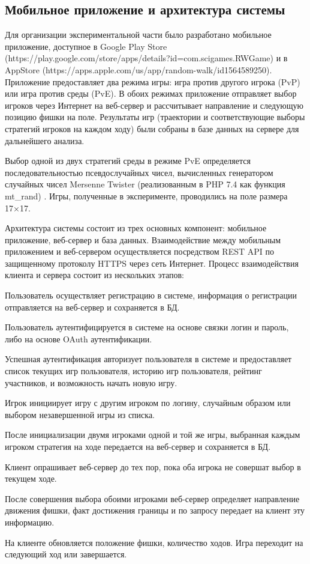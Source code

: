 \subsection{Мобильное приложение и архитектура системы}\label{subsec:ch1/sec2/sub2}

Для организации экспериментальной части было разработано мобильное приложение, 
доступное в Google Play Store (https://play.google.com/store/apps/details?id=com.scigames.RWGame) и 
в AppStore (https://apps.apple.com/us/app/random-walk/id1564589250). Приложение предоставляет два режима игры: 
игра против другого игрока (PvP) или игра против среды (PvE). В обоих режимах приложение отправляет выбор игроков 
через Интернет на веб-сервер и рассчитывает направление и следующую позицию фишки на поле. Результаты игр 
(траектории и соответствующие выборы стратегий игроков на каждом ходу) были собраны в базе данных на сервере для дальнейшего анализа.

Выбор одной из двух стратегий среды в режиме PvE определяется последовательностью псевдослучайных чисел, 
вычисленных генератором случайных чисел Mersenne Twister (реализованным в PHP 7.4 как функция mt_rand) \cite{}. 
Игры, полученные в эксперименте, проводились на  поле размера 17×17.

Архитектура системы состоит из трех основных компонент: мобильное приложение, веб-сервер и база данных.
Взаимодействие между мобильным приложением и веб-сервером осуществляется посредством REST API по защищенному протоколу HTTPS
через сеть Интернет. Процесс взаимодействия клиента и сервера состоит из нескольких этапов:
\item Пользователь осуществляет регистрацию в системе, информация о регистрации отправляется на веб-сервер и сохраняется в БД.
\item Пользователь аутентифицируется в системе на основе связки логин и пароль, либо на основе OAuth аутентификации.
\item Успешная аутентификация авторизует пользователя в системе и предоставляет список текущих игр пользователя, историю игр пользователя, рейтинг участников, и возможность начать новую игру.
\item Игрок инициирует игру с другим игроком по логину, случайным образом или выбором незавершенной игры из списка.
\item После инициализации двумя игроками одной и той же игры, выбранная каждым игроком стратегия на ходе передается на веб-сервер и сохраняется в БД.
\item Клиент опрашивает веб-сервер до тех пор, пока оба игрока не совершат выбор в текущем ходе.
\item После совершения выбора обоими игроками веб-сервер определяет направление движения фишки, факт достижения границы и по запросу передает на клиент эту информацию.
\item На клиенте обновляется положение фишки, количество ходов. Игра переходит на следующий ход или завершается.


